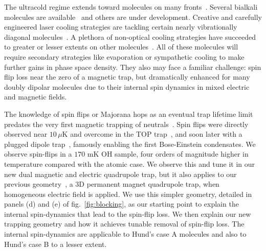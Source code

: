 \documentclass[%
 reprint,
groupedaddress,
 amsmath,amssymb,
 aps,
prl,
]{revtex4-1}
\begin{document}
%
%
The ultracold regime extends toward molecules on many fronts~\cite{Carr2009}. Several bialkali molecules are available~\cite{Ni2008, Takekoshi2014, Park2015} and others are under development. Creative and carefully engineered laser cooling strategies are tackling certain nearly vibrationally diagonal molecules~\cite{Steinecker2016, Barry2014, Hemmerling2016, Hummon2013, Zhelyazkova2014}. A plethora of non-optical cooling strategies have succeeded to greater or lesser extents on other molecules~\cite{Doyle1998,Prehn2016,Bethlem1999,Bochinski2003,Akerman2015}. All of these molecules will require secondary strategies like evaporation or sympathetic cooling to make further gains in phase space density. They also may face a familiar challenge: spin flip loss near the zero of a magnetic trap, but dramatically enhanced for many doubly dipolar molecules due to their internal spin dynamics in mixed electric and magnetic fields. 

The knowledge of spin flips or Majorana hops as an eventual trap lifetime limit predates the very first magnetic trapping of neutrals~\cite{Migdall1985}. Spin flips were directly observed near $10\,\mu\text{K}$ and overcome in the TOP trap~\cite{Petrich1995}, and soon later with a plugged dipole trap~\cite{Davis1995}, famously enabling the first Bose-Einstein condensates. We observe spin-flips in a $170\text{ mK}$ OH sample, four orders of magnitude higher in temperature compared with the atomic case. We observe this and tune it in our new dual magnetic and electric quadrupole trap, but it also applies to our previous geometry~\cite{Sawyer2008}, a 3D permanent magnet quadrupole trap, when homogeneous electric field is applied. We use this simpler geometry, detailed in panels (d) and (e) of fig.~\ref{fig:blocking}, as our starting point to explain the internal spin-dynamics that lead to the spin-flip loss. We then explain our new trapping geometry and how it achieves tunable removal of spin-flip loss. The internal spin-dynamics are applicable to Hund's case A molecules and also to Hund's case B to a lesser extent.%
\end{document}
